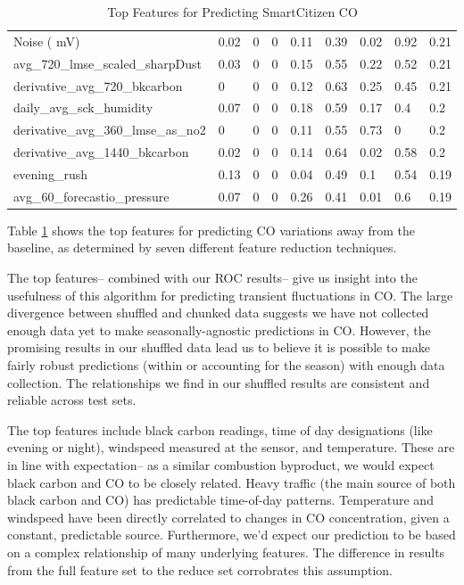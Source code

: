 \begin{table}[]
\begin{tabular}{lllllllll}
Noise ( mV)                         & 0.02  & 0          & 0    & 0.11 & 0.39  & 0.02      & 0.92 & 0.21 \\
avg\_720\_lmse\_scaled\_sharpDust   & 0.03  & 0          & 0    & 0.15 & 0.55  & 0.22      & 0.52 & 0.21 \\
derivative\_avg\_720\_bkcarbon      & 0     & 0          & 0    & 0.12 & 0.63  & 0.25      & 0.45 & 0.21 \\
daily\_avg\_sck\_humidity           & 0.07  & 0          & 0    & 0.18 & 0.59  & 0.17      & 0.4  & 0.2  \\
derivative\_avg\_360\_lmse\_as\_no2 & 0     & 0          & 0    & 0.11 & 0.55  & 0.73      & 0    & 0.2  \\
derivative\_avg\_1440\_bkcarbon     & 0.02  & 0          & 0    & 0.14 & 0.64  & 0.02      & 0.58 & 0.2  \\
evening\_rush                       & 0.13  & 0          & 0    & 0.04 & 0.49  & 0.1       & 0.54 & 0.19 \\
avg\_60\_forecastio\_pressure       & 0.07  & 0          & 0    & 0.26 & 0.41  & 0.01      & 0.6  & 0.19 \\
\bottomrule
\end{tabular}
\label{tab:sck_co_top_features}
\caption{Top Features for Predicting SmartCitizen CO}
\end{table}

Table \ref{tab:sck_co_top_features} shows the top features for predicting CO variations away from the baseline, as determined by seven different feature reduction techniques.   

The top features-- combined with our ROC results-- give us insight into the usefulness of this algorithm for predicting transient fluctuations in CO.  The large divergence between shuffled and chunked data suggests we have not collected enough data yet to make seasonally-agnostic predictions in CO.  However, the promising results in our shuffled data lead us to believe it is possible to make fairly robust predictions (within or accounting for the season) with enough data collection.  The relationships we find in our shuffled results are consistent and reliable across test sets.  

The top features include black carbon readings, time of day designations (like evening or night), windspeed measured at the sensor, and temperature.  These are in line with expectation-- as a similar combustion byproduct, we would expect black carbon and CO to be closely related.  Heavy traffic (the main source of both black carbon and CO) has predictable time-of-day patterns.  Temperature and windspeed have been directly correlated to changes in CO concentration, given a constant, predictable source.   Furthermore, we'd expect our prediction to be based on a complex relationship of many underlying features.  The difference in results from the full feature set to the reduce set corrobrates this assumption.   

